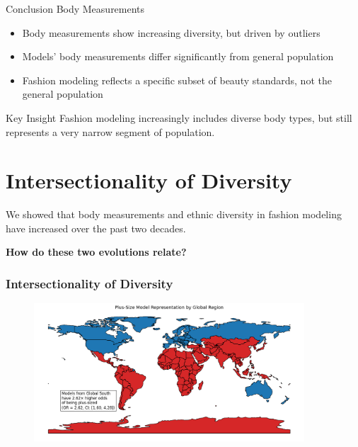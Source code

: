\documentclass[aspectratio=169,xcolor=dvipsnames,10pt]{beamer}
\begin{document}
\begin{frame}{Conclusion Body Measurements}
    \begin{itemize}
        \setlength{\itemsep}{0.8em}
        \pause \item Body measurements show increasing diversity, but driven by outliers
        \pause \item Models' body measurements differ significantly from general population
        \pause \item Fashion modeling reflects a specific subset of beauty standards, not the general population
    \end{itemize}
    \pause
    \vspace{1em}
    \begin{block}{Key Insight}
        Fashion modeling increasingly includes diverse body types, but still represents a very narrow segment of population.
    \end{block}
    
\end{frame}
\section{Intersectionality of Diversity}


\begin{frame}
    \Large{
        \begin{center}
            We showed that body measurements and ethnic diversity in fashion modeling have increased over the past two decades.\\
                        \vspace{1em}

            \textbf{How do these two evolutions relate?}\\
        \end{center}
    }
\end{frame}


\begin{frame}[t]
    \frametitle{Intersectionality of Diversity}
    \begin{figure}
            \begin{center}
            \includegraphics[width=0.9\textwidth]{figures/map_oddratio.png}
            \end{center}
        \end{figure}
\end{frame}
\end{document}
